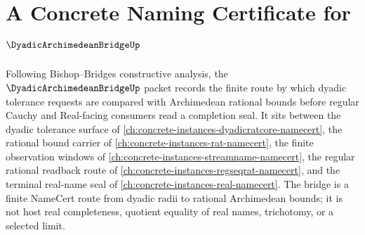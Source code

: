 \chapter{A Concrete Naming Certificate for $\DyadicArchimedeanBridgeUp$}
\label{ch:concrete-instances-dyadic-archimedean-bridge-namecert}

Following Bishop--Bridges constructive analysis, the $\DyadicArchimedeanBridgeUp$ packet records the finite route by which dyadic tolerance requests are compared with Archimedean rational bounds before regular Cauchy and Real-facing consumers read a completion seal. It sits between the dyadic tolerance surface of \autoref{ch:concrete-instances-dyadicratcore-namecert}, the rational bound carrier of \autoref{ch:concrete-instances-rat-namecert}, the finite observation windows of \autoref{ch:concrete-instances-streamname-namecert}, the regular rational readback route of \autoref{ch:concrete-instances-regseqrat-namecert}, and the terminal real-name seal of \autoref{ch:concrete-instances-real-namecert}. The bridge is a finite NameCert route from dyadic radii to rational Archimedean bounds; it is not host real completeness, quotient equality of real names, trichotomy, or a selected limit.

